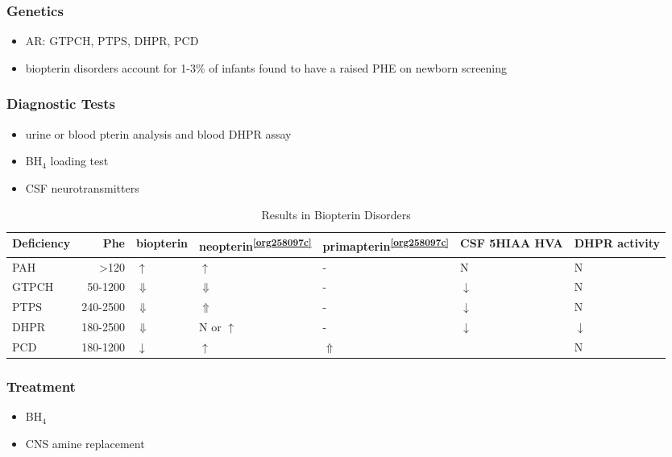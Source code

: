 \documentclass{scrartcl}
\begin{document}
\subsubsection{Genetics}
\label{sec:org88c2780}
\begin{itemize}
\item AR: GTPCH, PTPS, DHPR, PCD
\item biopterin disorders account for 1-3\% of infants found to have a
raised PHE on newborn screening
\end{itemize}

\subsubsection{Diagnostic Tests}
\label{sec:orgc09351b}
\begin{itemize}
\item urine or blood pterin analysis and blood DHPR assay
\item BH\(_{\text{4}}\) loading test
\item CSF neurotransmitters
\end{itemize}

\begin{table}[htbp]
\caption{\label{tab:org09f24d4}
Results in Biopterin Disorders}
\centering
\begin{tabular}{lrlllll}
Deficiency & Phe & biopterin\footnotemark & neopterin\textsuperscript{\ref{org258097c}} & primapterin\textsuperscript{\ref{org258097c}} & CSF 5HIAA HVA & DHPR activity\\
\hline
PAH & \textgreater{}120 & \(\uparrow\) & \(\uparrow\) & - & N & N\\
GTPCH & 50-1200 & \(\Downarrow\) & \(\Downarrow\) & - & \(\downarrow\) & N\\
PTPS & 240-2500 & \(\Downarrow\) & \(\Uparrow\) & - & \(\downarrow\) & N\\
DHPR & 180-2500 & \(\Downarrow\) & N or \(\uparrow\) & - & \(\downarrow\) & \(\downarrow\)\\
PCD & 180-1200 & \(\downarrow\) & \(\uparrow\) & \(\Uparrow\) &  & N\\
\end{tabular}
\end{table}

\subsubsection{Treatment}
\label{sec:org6e730f1}
\begin{itemize}
\item BH\(_{\text{4}}\)
\item CNS amine replacement
\end{itemize}
\end{document}

